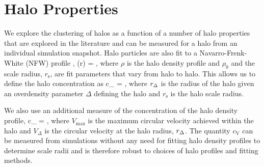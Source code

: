 \documentclass[usenatbib,usegraphicx,letterpaper]{mn2e}
\begin{document}

\section{Halo Properties}
\label{section:haloprops}

We explore the clustering of halos as a function of a number of halo properties that are explored in the 
literature and can be measured for a halo from an individual simulation snapshot. Halo particles are also fit to
a Navarro-Frenk-White (NFW) profile \citep{nfw97},
\beq
\rho(r) = ,
\eeq
where $\rho$ is the halo density profile and $\rho_0$ and the scale radius, $r_{\mathrm{s}}$, are fit parameters
that vary from halo to halo. This allows us to define the halo concentration as
\beq
c_{} = ,
\eeq
where $r_{\Delta}$ is the radius of the halo given an overdensity parameter $\Delta$ defining the halo and 
$r_{\mathrm{s}}$ is the halo scale radius. 

We also use an additional measure of the concentration of the halo density profile, 
\beq
c_{} = , 
\eeq
where $V_{\mathrm{max}}$ is the maximum circular velocity achieved within the halo and $V_{\Delta}$ is the
circular velocity at the halo radius, $r_{\Delta}$. The quantity $c_{\mathrm{V}}$ can be measured from simulations
without any need for fitting halo density profiles to determine scale radii and is therefore robust to choices of
halo profiles and fitting methods. 
\end{document}
